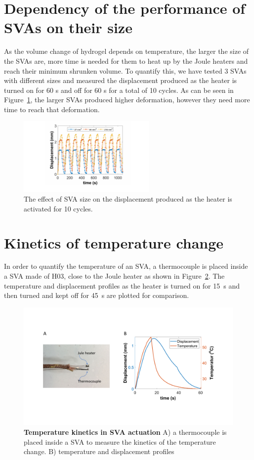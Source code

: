 \section{Dependency of the performance of SVAs on their size}
As the volume change of hydrogel depends on temperature, the larger the size of the SVAs are, more time is needed for them to heat up by the Joule heaters and reach their minimum shrunken volume. To quantify this, we have tested 3 SVAs with different sizes and measured the displacement produced as the heater is turned on for 60 s and off for 60 s for a total of 10 cycles. As can be seen in Figure~\ref{fig:svaSize}, the larger SVAs produced higher deformation, however they need more time to reach that deformation. 
\begin{figure}[!htb]
      \centering
      \includegraphics[width=0.6\textwidth]{svaSize.pdf}
      \caption[Effect of SVA size]{The effect of SVA size on the displacement produced as the heater is activated for 10 cycles.}
      \label{fig:svaSize}
\end{figure}

\section{Kinetics of temperature change} 
In order to quantify the temperature of an SVA, a thermocouple is placed inside a SVA made of H03, close to the Joule heater as shown in Figure~\ref{fig:tempKinetics}. The temperature and displacement profiles as the heater is turned on for 15~s and then turned and kept off for 45~s are plotted for comparison.

\begin{figure}[!htb]
\centering
\includegraphics[width=\textwidth]{tempKinetics.pdf}
    \caption[Temperature kinetics in SVA actuation]{\textbf{Temperature kinetics in SVA actuation} A) a thermocouple is placed inside a SVA to measure the kinetics of the temperature change. B) temperature and displacement profiles }
    \label{fig:tempKinetics}
\end{figure}

